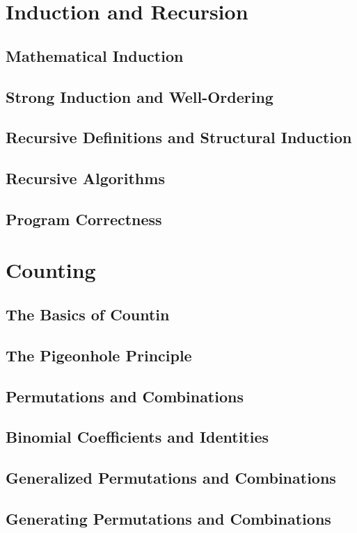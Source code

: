\documentclass{article}
\begin{document}
\section{Induction and Recursion}

\subsection{Mathematical Induction}
\subsection{Strong Induction and Well-Ordering}
\subsection{Recursive Definitions and Structural Induction}
\subsection{Recursive Algorithms}
\subsection{Program Correctness}

\section{Counting}

\subsection{The Basics of Countin}
\subsection{The Pigeonhole Principle}
\subsection{Permutations and Combinations}
\subsection{Binomial Coefficients and Identities}
\subsection{Generalized Permutations and Combinations}
\subsection{Generating Permutations and Combinations}
\end{document}
